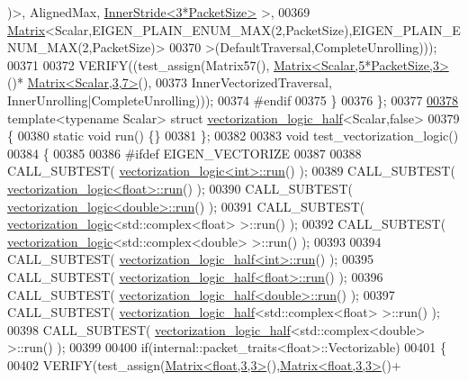 \begin{DoxyCode}
      )>, AlignedMax, \hyperlink{class_eigen_1_1_inner_stride}{InnerStride<3*PacketSize>} >,
00369             \hyperlink{group___core___module_class_eigen_1_1_matrix}{Matrix}<Scalar,EIGEN\_PLAIN\_ENUM\_MAX(2,PacketSize),EIGEN\_PLAIN\_ENUM\_MAX(2,PacketSize)>
00370             >(DefaultTraversal,CompleteUnrolling)));
00371 
00372     VERIFY((test\_assign(Matrix57(), \hyperlink{group___core___module_class_eigen_1_1_matrix}{Matrix<Scalar,5*PacketSize,3>}()*
      \hyperlink{group___core___module_class_eigen_1_1_matrix}{Matrix<Scalar,3,7>}(),
00373                         InnerVectorizedTraversal, InnerUnrolling|CompleteUnrolling)));
00374 \textcolor{preprocessor}{    #endif}
00375   \}
00376 \};
00377 
\hyperlink{structvectorization__logic__half_3_01_scalar_00_01false_01_4}{00378} \textcolor{keyword}{template}<\textcolor{keyword}{typename} Scalar> \textcolor{keyword}{struct }\hyperlink{structvectorization__logic__half}{vectorization\_logic\_half}<Scalar,false>
00379 \{
00380   \textcolor{keyword}{static} \textcolor{keywordtype}{void} run() \{\}
00381 \};
00382 
00383 \textcolor{keywordtype}{void} test\_vectorization\_logic()
00384 \{
00385 
00386 \textcolor{preprocessor}{#ifdef EIGEN\_VECTORIZE}
00387 
00388   CALL\_SUBTEST( \hyperlink{structvectorization__logic}{vectorization\_logic<int>::run}() );
00389   CALL\_SUBTEST( \hyperlink{structvectorization__logic}{vectorization\_logic<float>::run}() );
00390   CALL\_SUBTEST( \hyperlink{structvectorization__logic}{vectorization\_logic<double>::run}() );
00391   CALL\_SUBTEST( \hyperlink{structvectorization__logic}{vectorization\_logic}<std::complex<float> >::run() );
00392   CALL\_SUBTEST( \hyperlink{structvectorization__logic}{vectorization\_logic}<std::complex<double> >::run() );
00393   
00394   CALL\_SUBTEST( \hyperlink{structvectorization__logic__half}{vectorization\_logic\_half<int>::run}() );
00395   CALL\_SUBTEST( \hyperlink{structvectorization__logic__half}{vectorization\_logic\_half<float>::run}() );
00396   CALL\_SUBTEST( \hyperlink{structvectorization__logic__half}{vectorization\_logic\_half<double>::run}() );
00397   CALL\_SUBTEST( \hyperlink{structvectorization__logic__half}{vectorization\_logic\_half}<std::complex<float> >::run() );
00398   CALL\_SUBTEST( \hyperlink{structvectorization__logic__half}{vectorization\_logic\_half}<std::complex<double> >::run() );
00399   
00400   \textcolor{keywordflow}{if}(internal::packet\_traits<float>::Vectorizable)
00401   \{
00402     VERIFY(test\_assign(\hyperlink{group___core___module_class_eigen_1_1_matrix}{Matrix<float,3,3>}(),\hyperlink{group___core___module_class_eigen_1_1_matrix}{Matrix<float,3,3>}()+

\end{DoxyCode}
